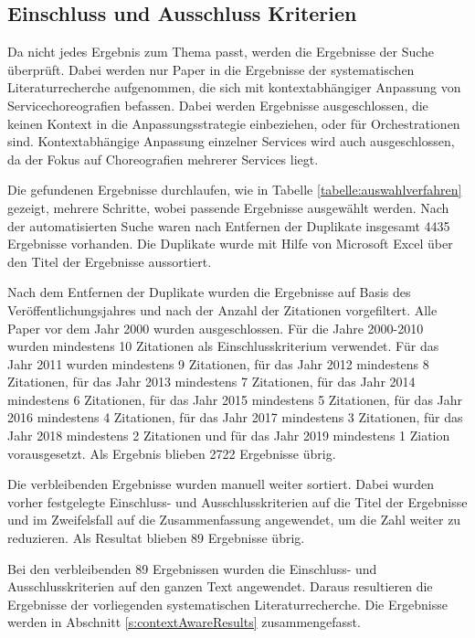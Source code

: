 \documentclass[conference,compsoc]{IEEEtran}
\begin{document}
\subsection{Einschluss und Ausschluss Kriterien}
Da nicht jedes Ergebnis zum Thema passt, werden die Ergebnisse der Suche überprüft. Dabei werden nur Paper in die Ergebnisse der systematischen Literaturrecherche aufgenommen, die sich mit kontextabhängiger Anpassung von Servicechoreografien befassen. Dabei werden Ergebnisse ausgeschlossen, die keinen Kontext in die Anpassungsstrategie einbeziehen, oder für Orchestrationen sind. Kontextabhängige Anpassung einzelner Services wird auch ausgeschlossen, da der Fokus auf Choreografien mehrerer Services liegt.

Die gefundenen Ergebnisse durchlaufen, wie in Tabelle \ref{tabelle:auswahlverfahren} gezeigt, mehrere Schritte, wobei passende Ergebnisse ausgewählt werden. Nach der automatisierten Suche waren nach Entfernen der Duplikate insgesamt 4435 Ergebnisse vorhanden. Die Duplikate wurde mit Hilfe von Microsoft Excel über den Titel der Ergebnisse aussortiert.

Nach dem Entfernen der Duplikate wurden die Ergebnisse auf Basis des Veröffentlichungsjahres und nach der Anzahl der Zitationen vorgefiltert.
Alle Paper vor dem Jahr 2000 wurden ausgeschlossen. Für die Jahre 2000-2010 wurden mindestens 10 Zitationen als Einschlusskriterium verwendet. Für das Jahr 2011 wurden mindestens 9 Zitationen, für das Jahr 2012 mindestens 8 Zitationen, für das Jahr 2013 mindestens 7 Zitationen, für das Jahr 2014 mindestens 6 Zitationen, für das Jahr 2015 mindestens 5 Zitationen, für das Jahr 2016 mindestens 4 Zitationen, für das Jahr 2017 mindestens 3 Zitationen, für das Jahr 2018 mindestens 2 Zitationen und für das Jahr 2019 mindestens 1 Ziation vorausgesetzt. Als Ergebnis blieben 2722 Ergebnisse übrig.

Die verbleibenden Ergebnisse wurden manuell weiter sortiert. Dabei wurden vorher festgelegte Einschluss- und Ausschlusskriterien auf die Titel der Ergebnisse und im Zweifelsfall auf die Zusammenfassung angewendet, um die Zahl weiter zu reduzieren. Als Resultat blieben 89 Ergebnisse übrig.

Bei den verbleibenden 89 Ergebnissen wurden die Einschluss- und Ausschlusskriterien auf den ganzen Text angewendet. Daraus resultieren die Ergebnisse der vorliegenden systematischen Literaturrecherche. Die Ergebnisse werden in Abschnitt \ref{s:contextAwareResults} zusammengefasst.
\end{document}
